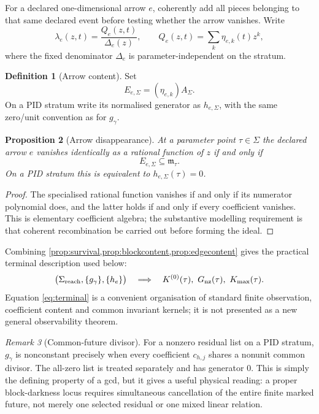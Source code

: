 \documentclass[11pt]{article}
\newtheorem{proposition}{Proposition}[section]
\theoremstyle{definition}
\newtheorem{definition}[proposition]{Definition}
\theoremstyle{remark}
\newtheorem{remark}[proposition]{Remark}
\newcommand{\Kzero}{K^{(0)}}
\newcommand{\Kmax}{K_{\max}}
\begin{document}
For a declared one-dimensional arrow $e$, coherently add all pieces belonging to that same declared event before testing whether the arrow vanishes. Write
\[
\lambda_e(z,t)=\frac{Q_e(z,t)}{\Delta_e(z)},
\qquad Q_e(z,t)=\sum_k\eta_{e,k}(t)z^k,
\]
where the fixed denominator $\Delta_e$ is parameter-independent on the stratum.

\begin{definition}[Arrow content]
Set
\[
E_{e,\Sigma}=(\eta_{e,k})A_\Sigma.
\]
On a PID stratum write its normalised generator as $h_{e,\Sigma}$, with the same zero/unit convention as for $g_\gamma$.
\end{definition}

\begin{proposition}[Arrow disappearance]\label{prop:edgecontent}
At a parameter point $\tau\in\Sigma$ the declared arrow $e$ vanishes identically as a rational function of $z$ if and only if
\[
E_{e,\Sigma}\subseteq\mathfrak m_\tau.
\]
On a PID stratum this is equivalent to $h_{e,\Sigma}(\tau)=0$.
\end{proposition}

\begin{proof}
The specialised rational function vanishes if and only if its numerator polynomial does, and the latter holds if and only if every coefficient vanishes. This is elementary coefficient algebra; the substantive modelling requirement is that coherent recombination be carried out before forming the ideal.
\end{proof}

Combining \cref{prop:survival,prop:blockcontent,prop:edgecontent} gives the practical terminal description used below:
\begin{equation}\label{eq:terminal}
\bigl(\Sigma_{\rm reach},\{g_\gamma\},\{h_e\}\bigr)
\quad\Longrightarrow\quad
\Kzero(\tau),\ G_{\rm nz}(\tau),\ \Kmax(\tau).
\end{equation}
Equation \eqref{eq:terminal} is a convenient organisation of standard finite observation, coefficient content and common invariant kernels; it is not presented as a new general observability theorem.

\begin{remark}[Common-future divisor]
For a nonzero residual list on a PID stratum, $g_\gamma$ is nonconstant precisely when every coefficient $c_{h,j}$ shares a nonunit common divisor. The all-zero list is treated separately and has generator $0$. This is simply the defining property of a gcd, but it gives a useful physical reading: a proper block-darkness locus requires simultaneous cancellation of the entire finite marked future, not merely one selected residual or one mixed linear relation.
\end{remark}
\end{document}
